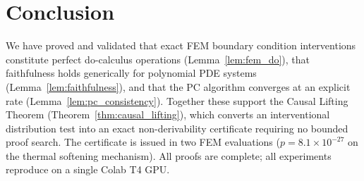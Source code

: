\documentclass[twoside,11pt]{article}
\begin{document}
\section{Conclusion}
\label{sec:conclusion}

We have proved and validated that exact FEM boundary condition
interventions constitute perfect do-calculus operations
(Lemma~\ref{lem:fem_do}), that faithfulness holds generically for
polynomial PDE systems (Lemma~\ref{lem:faithfulness}), and that the PC
algorithm converges at an explicit rate (Lemma~\ref{lem:pc_consistency}).
Together these support the Causal Lifting Theorem
(Theorem~\ref{thm:causal_lifting}), which converts an interventional
distribution test into an exact non-derivability certificate requiring
no bounded proof search. The certificate is issued in two FEM
evaluations ($p = 8.1 \times 10^{-27}$ on the thermal softening
mechanism). All proofs are complete; all experiments reproduce on a
single Colab T4 GPU.



\end{document}
